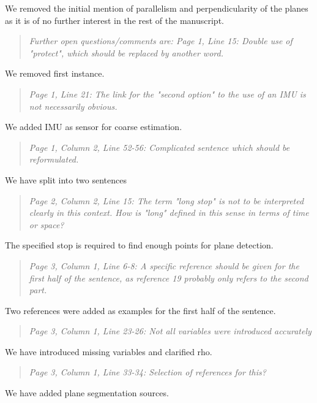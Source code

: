 \documentclass{article}
\newenvironment{itquote}
  {\begin{quote}\itshape}
  {\end{quote}\ignorespacesafterend}
\begin{document}
We removed the initial mention of parallelism and perpendicularity of the planes
as it is of no further interest in the rest of the manuscript. 

\begin{itquote}
Further open questions/comments are:
Page 1, Line 15: Double use of "protect", which should be replaced
by another word.
\end{itquote}

We removed first instance.

\begin{itquote}
Page 1, Line 21: The link for the "second option" to the use of an
IMU is not necessarily obvious.
\end{itquote}

We added IMU as sensor for coarse estimation.

\begin{itquote}
Page 1, Column 2, Line 52-56: Complicated sentence which should be
reformulated.
\end{itquote}

We have split into two sentences

\begin{itquote}
Page 2, Column 2, Line 15: The term "long stop" is not to be
interpreted clearly in this context. How is "long" defined in this
sense in terms of time or space?
\end{itquote}

The specified stop is required to find enough points for plane
detection.

\begin{itquote}
Page 3, Column 1, Line 6-8: A specific reference should be given for
the first half of the sentence, as reference 19 probably only refers
to the second part.
\end{itquote}

Two references were added as examples for the first half of the sentence.

\begin{itquote}
Page 3, Column 1, Line 23-26: Not all variables were introduced
accurately
\end{itquote}

We have introduced missing variables and clarified rho.

\begin{itquote}
Page 3, Column 1, Line 33-34: Selection of references for this?
\end{itquote}

We have added plane segmentation sources.
\end{document}
